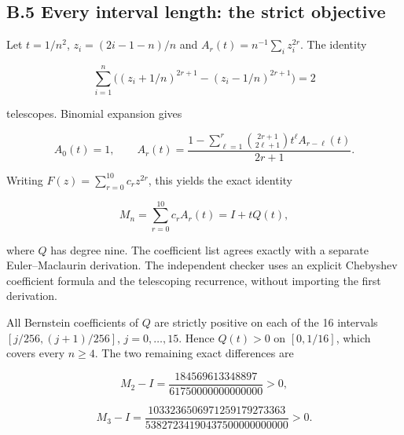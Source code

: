 \documentclass[11pt,a4paper]{article}
\begin{document}

\hypertarget{b.5-every-interval-length-the-strict-objective}{%
\subsection{B.5 Every interval length: the strict
objective}\label{b.5-every-interval-length-the-strict-objective}}

\begin{samepage}

Let \(t=1/n^2\), \(z_i=(2i-1-n)/n\) and
\(A_r(t)=n^{-1}\sum_i z_i^{2r}\). The identity

\[\sum_{i=1}^n\big((z_i+1/n)^{2r+1}-(z_i-1/n)^{2r+1}\big)=2\]

\end{samepage}

\begin{samepage}

telescopes. Binomial expansion gives

\[
A_0(t)=1,\qquad
A_r(t)=\frac{1-\sum_{\ell=1}^{r}{2r+1\choose2\ell+1}t^\ell A_{r-\ell}(t)}{2r+1}.
\]

\end{samepage}

\begin{samepage}

Writing \(F(z)=\sum_{r=0}^{10}c_rz^{2r}\), this yields the exact
identity

\[M_n=\sum_{r=0}^{10}c_rA_r(t)=I+tQ(t),\]

\end{samepage}

where \(Q\) has degree nine. The coefficient list agrees exactly with a
separate Euler--Maclaurin derivation. The independent checker uses an
explicit Chebyshev coefficient formula and the telescoping recurrence,
without importing the first derivation.

\begin{samepage}

All Bernstein coefficients of \(Q\) are strictly positive on each of the
16 intervals \([j/256,(j+1)/256]\), \(j=0,\ldots,15\). Hence \(Q(t)>0\)
on \([0,1/16]\), which covers every \(n\ge4\). The two remaining exact
differences are

\[M_2-I=\frac{184569613348897}{61750000000000000}>0,\]

\end{samepage}

\begin{samepage}

\[M_3-I=\frac{1033236506971259179273363}{53827234190437500000000000}>0.\]

\end{samepage}
\end{document}
